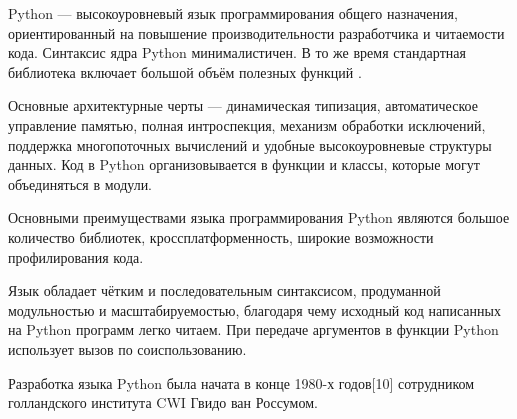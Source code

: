 Python --- высокоуровневый язык программирования общего назначения, ориентированный на повышение производительности разработчика и читаемости кода. Синтаксис ядра Python минималистичен. В то же время стандартная библиотека включает большой объём полезных функций \cite{python_wiki}. 


Основные архитектурные черты — динамическая типизация, автоматическое управление памятью, полная интроспекция, механизм обработки исключений, поддержка многопоточных вычислений и удобные высокоуровневые структуры данных. Код в Python организовывается в функции и классы, которые могут объединяться в модули.

Основными преимуществами языка программирования Python являются большое количество библиотек, кроссплатформенность, широкие возможности профилирования кода. 

Язык обладает чётким и последовательным синтаксисом, продуманной модульностью и масштабируемостью, благодаря чему исходный код написанных на Python программ легко читаем. При передаче аргументов в функции Python использует вызов по соиспользованию.

Разработка языка Python была начата в конце 1980-х годов[10] сотрудником голландского института CWI Гвидо ван Россумом.